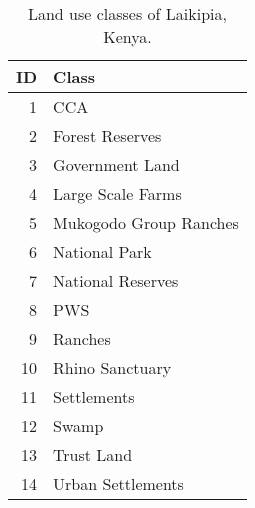 \begin{table}[H]
\centering
\caption[Land use classes of Laikipia]{Land use classes of Laikipia, Kenya.} 
\label{table:lu_classes}
\begin{tabular}{rl}
  \toprule
ID & Class \\ 
  \midrule
  1 & CCA \\ 
    2 & Forest Reserves \\ 
    3 & Government Land \\ 
    4 & Large Scale Farms \\ 
    5 & Mukogodo Group Ranches \\ 
    6 & National Park \\ 
    7 & National Reserves \\ 
    8 & PWS \\ 
    9 & Ranches \\ 
   10 & Rhino Sanctuary \\ 
   11 & Settlements \\ 
   12 & Swamp \\ 
   13 & Trust Land \\ 
   14 & Urban Settlements \\ 
   \bottomrule
\end{tabular}
\end{table}
